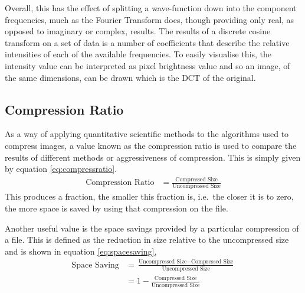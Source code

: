 Overall, this has the effect of splitting a wave-function down into the component frequencies, much as the Fourier Transform does, though providing only real, as opposed to imaginary or complex, results. The results of a discrete cosine transform on a set of data is a number of coefficients that describe the relative intensities of each of the available frequencies. To easily visualise this, the intensity value can be interpreted as pixel brightness value and so an image, of the same dimensions, can be drawn which is the DCT of the original.

\subsection{Compression Ratio} %
\label{sub:compression_ratio}
As a way of applying quantitative scientific methods to the algorithms used to compress images, a value known as the compression ratio is used to compare the results of different methods or aggressiveness of compression. This is simply given by equation \ref{eq:compressratio}.
\begin{align}
	\text{Compression Ratio} &= \frac{\text{Compressed Size}}{\text{Uncompressed Size}} \label{eq:compressratio}
\end{align}
This produces a fraction, the smaller this fraction is, i.e.\ the closer it is to zero, the more space is saved by using that compression on the file.

Another useful value is the space savings provided by a particular compression of a file. This is defined as the reduction in size relative to the uncompressed size and is shown in equation \ref{eq:spacesaving},
\begin{align}
	\text{Space Saving} &= \frac{\text{Uncompressed Size} - \text{Compressed Size}}{\text{Uncompressed Size}} \\
	 &= 1- \frac{\text{Compressed Size}}{\text{Uncompressed Size}} \label{eq:spacesaving}
\end{align}

